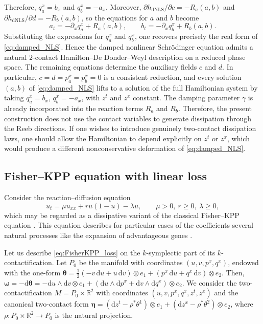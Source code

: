 \documentclass[11pt,a4paper]{article}
\newcommand{\dd}{\mathrm{d}}
\theoremstyle{plain} \newtheorem{theorem}{Theorem}[section] \newtheorem{proposition}[theorem]{Proposition} \newtheorem{corollary}[theorem]{Corollary} \newtheorem{lemma}[theorem]{Lemma} \theoremstyle{definition} \newtheorem{definition}[theorem]{Definition} \theoremstyle{remark} \newtheorem{remark}[theorem]{Remark} \newtheorem{example}[theorem]{Example} %
\begin{document}
Therefore, \(q_a^x=b_x\) and \(q_b^x=-a_x\). Moreover, \(\partial h_{\mathrm{dNLS}}/\partial c=-R_a(a,b)\) and \(\partial h_{\mathrm{dNLS}}/\partial d=-R_b(a,b)\), so the equations for \(a\) and \(b\) become \[ a_t=-\partial_x q_a^x+R_a(a,b),\qquad b_t=-\partial_x q_b^x+R_b(a,b). \] Substituting the expressions for \(q_a^x\) and \(q_b^x\), one recovers precisely the real form of \eqref{eq:damped_NLS}. Hence the damped nonlinear Schr\"odinger equation admits a natural \(2\)-contact Hamilton--De Donder--Weyl description on a reduced phase space. The remaining equations determine the auxiliary fields \(c\) and \(d\). In particular, \(c=d=p_a^x=p_b^x=0\) is a consistent reduction, and every solution \((a,b)\) of \eqref{eq:damped_NLS} lifts to a solution of the full Hamiltonian system by taking \(q_a^x=b_x\), \(q_b^x=-a_x\), with \(z^t\) and \(z^x\) constant. The damping parameter \(\gamma\) is already incorporated into the reaction terms \(R_a\) and \(R_b\). Therefore, the present construction does not use the contact variables to generate dissipation through the Reeb directions. If one wishes to introduce genuinely two-contact dissipation laws, one should allow the Hamiltonian to depend explicitly on \(z^t\) or \(z^x\), which would produce a different nonconservative deformation of \eqref{eq:damped_NLS}.
 
\subsection{Fisher--KPP equation with linear loss}
\label{subsec:Fisher}

Consider the reaction--diffusion equation
\begin{equation}\label{eq:FisherKPP_loss}
u_t=\mu u_{xx}+ru(1-u)-\lambda u,\qquad \mu>0,\ r\ge0,\ \lambda\ge0,
\end{equation}
which may be regarded as a dissipative variant of the classical Fisher--KPP equation \cite{Fisher1937,KurataShi2008,Wang2016,OrugantiShiShivaji2002,RoquesChekroun2007}. This equation describes for particular cases of the coefficients several natural processes like the expansion of advantageous genes \cite{Fisher1937}.

Let us describe \eqref{eq:FisherKPP_loss} on the $k$-symplectic part of its $k$-contactification. Let \(P_0\) be the manifold with coordinates \((u,v,p^x,q^x)\), endowed with the one-form \(\bm \theta=\frac12(-v\,\dd u+u\,\dd v)\otimes e_1+(p^x\,\dd u+q^x\,\dd v)\otimes e_2\). Then, \(\bm\omega=-\dd\bm \theta=-\dd u\wedge \dd v\otimes e_1+(\dd u\wedge \dd p^x+\dd v\wedge \dd q^x)\otimes e_2\). We consider the two-contactification \(M=P_0\times\mathbb R^2\) with coordinates \((u,v,p^x,q^x,z^t,z^x)\) and  the canonical two-contact form \(\bm\eta=(\dd z^t-\rho^*\theta^1)\otimes e_1+(\dd z^x-\rho^*\theta^2)\otimes e_2\), where $\rho:P_0\times \mathbb{R}^2\rightarrow P_0$ is the natural projection.
\end{document}
